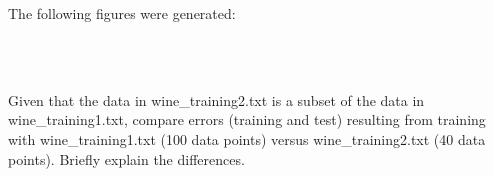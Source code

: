 \begin{solution}
  The following figures were generated:
  \begin{figure}[H]
    \\
    \\
  \end{figure}
\end{solution}

\problem[4]
Given that the data in wine\_training2.txt is a subset of the data in wine\_training1.txt, compare errors (training and test) resulting from training with wine\_training1.txt (100 data points) versus wine\_training2.txt (40 data points). Briefly explain the differences.

